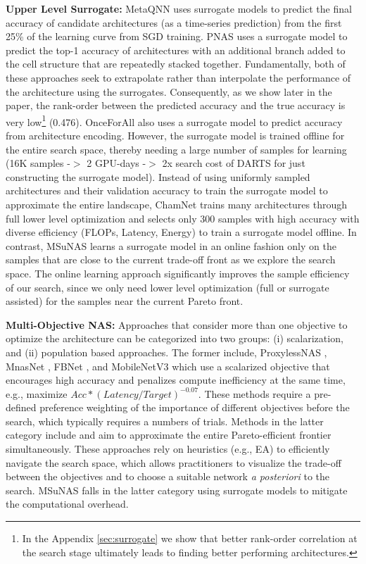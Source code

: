 \documentclass[runningheads]{llncs}
\def\ourmethod{MSuNAS}
\begin{document}
\vspace{5pt}
\noindent\textbf{Upper Level Surrogate:} MetaQNN \cite{baker2017accelerating} uses surrogate models to predict the final accuracy of candidate architectures (as a time-series prediction) from the first 25\% of the learning curve from SGD training. PNAS \cite{PNAS} uses a surrogate model to predict the top-1 accuracy of architectures with an additional branch added to the cell structure that are repeatedly stacked together. Fundamentally, both of these approaches seek to extrapolate rather than interpolate the performance of the architecture using the surrogates. Consequently, as we show later in the paper, the rank-order between the predicted accuracy and the true accuracy is very low\footnote{In the Appendix \ref{sec:surrogate} we show that better rank-order correlation at the search stage ultimately leads to finding better performing architectures.} (0.476). OnceForAll \cite{onceforall} also uses a surrogate model to predict accuracy from architecture encoding. However, the surrogate model is trained offline for the entire search space, thereby needing a large number of samples for learning (16K samples -$>$ 2 GPU-days -$>$ 2x search cost of DARTS for just constructing the surrogate model). Instead of using uniformly sampled architectures and their validation accuracy to train the surrogate model to approximate the entire landscape, ChamNet \cite{chamnet} trains many architectures through full lower level optimization and selects only 300 samples with high accuracy with diverse efficiency (FLOPs, Latency, Energy) to train a surrogate model offline. In contrast, \ourmethod{} learns a surrogate model in an online fashion only on the samples that are close to the current trade-off front as we explore the search space. The online learning approach significantly improves the sample efficiency of our search, since we only need lower level optimization (full or surrogate assisted) for the samples near the current Pareto front.

\vspace{5pt}
\noindent\textbf{Multi-Objective NAS:} Approaches that consider more than one objective to optimize the architecture can be categorized into two groups: (i) scalarization, and (ii) population based approaches. The former include, ProxylessNAS \cite{proxylessnas}, MnasNet \cite{mnasnet}, FBNet \cite{fbnet}, and MobileNetV3 \cite{mobilenetv3} which use a scalarized objective that encourages high accuracy and penalizes compute inefficiency at the same time, e.g., maximize $Acc * (Latency / Target)^{-0.07}$. These methods require a pre-defined preference weighting of the importance of different objectives before the search, which typically requires a numbers of trials. Methods in the latter category include \cite{NSGANet,LEMONADE,dppnet,chu2019fairnas,muxconv} and aim to approximate the entire Pareto-efficient frontier simultaneously. These approaches rely on heuristics (e.g., EA) to efficiently navigate the search space, which allows practitioners to visualize the trade-off between the objectives and to choose a suitable network \emph{a posteriori} to the search. \ourmethod{} falls in the latter category using surrogate models to mitigate the computational overhead.
\end{document}
